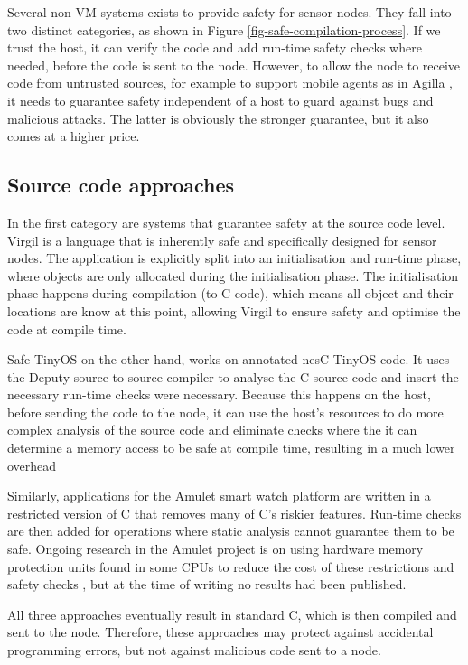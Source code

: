 Several non-VM systems exists to provide safety for sensor nodes. They fall into two distinct categories, as shown in Figure \ref{fig-safe-compilation-process}. If we trust the host, it can verify the code and add run-time safety checks where needed, before the code is sent to the node. However, to allow the node to receive code from untrusted sources, for example to support mobile agents as in Agilla \cite{Fok:2005bh}, it needs to guarantee safety independent of a host to guard against bugs and malicious attacks. The latter is obviously the stronger guarantee, but it also comes at a higher price.

\subsection{Source code approaches}
In the first category are systems that guarantee safety at the source code level. Virgil \cite{Titzer:2006uy} is a language that is inherently safe and specifically designed for sensor nodes. The application is explicitly split into an initialisation and run-time phase, where objects are only allocated during the initialisation phase. The initialisation phase happens during compilation (to C code), which means all object and their locations are know at this point, allowing Virgil to ensure safety and optimise the code at compile time.

Safe TinyOS \cite{Cooprider:2007ub} on the other hand, works on annotated nesC TinyOS code. It uses the Deputy \cite{Condit:2007uo} source-to-source compiler to analyse the C source code and insert the necessary run-time checks were necessary. Because this happens on the host, before sending the code to the node, it can use the host's resources to do more complex analysis of the source code and eliminate checks where the it can determine a memory access to be safe at compile time, resulting in a much lower overhead

Similarly, applications for the Amulet \cite{Hester:2016je} smart watch platform are written in a restricted version of C that removes many of C's riskier features. Run-time checks are then added for operations where static analysis cannot guarantee them to be safe. Ongoing research in the Amulet project is on using hardware memory protection units found in some CPUs to reduce the cost of these restrictions and safety checks \cite{Hardin:2017cq}, but at the time of writing no results had been published.

All three approaches eventually result in standard C, which is then compiled and sent to the node. Therefore, these approaches may protect against accidental programming errors, but not against malicious code sent to a node.

